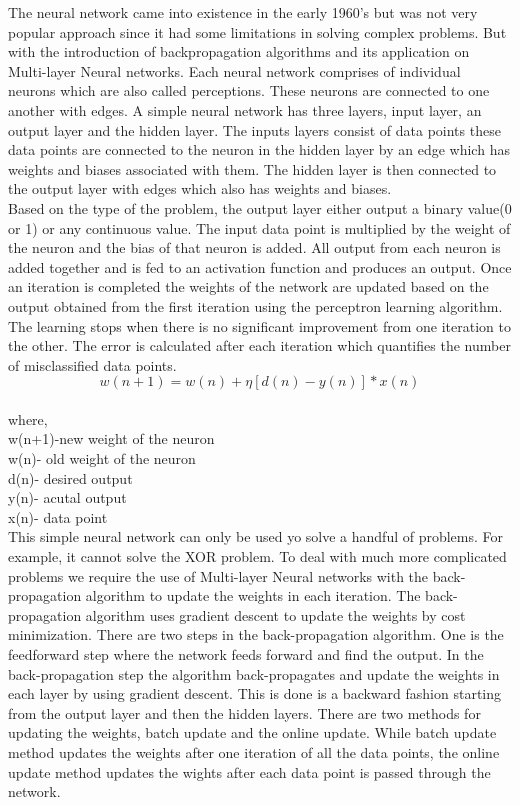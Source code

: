 \documentclass[sigconf]{acmart}
\begin{document}
The neural network came into existence in the early 1960's but was not very popular approach since it had some limitations in solving complex problems. But with the introduction of backpropagation algorithms and its application on Multi-layer Neural networks. Each neural network comprises of individual neurons which are also called perceptions. These neurons are connected to one another with edges. A simple neural network has three layers, input layer, an output layer and the hidden layer. The inputs layers consist of data points these data points are connected to the neuron in the hidden layer by an edge which has weights and biases associated with them. The hidden layer is then connected to the output layer with edges which also has weights and biases.\cite{Williamson1}\\
Based on the type of the problem, the output layer either output a binary value(0 or 1) or any continuous value. The input data point is multiplied by the weight of the neuron and the bias of that neuron is added. All output from each neuron is added together and is fed to an activation function and produces an output. Once an iteration is completed the weights of the network are updated based on the output obtained from the first iteration using the perceptron learning algorithm. The learning stops when there is no significant improvement from one iteration to the other. The error is calculated after each iteration which quantifies the number of misclassified data points.\cite{Williamson1}\\
\begin{equation}
   w(n+1) = w(n) + \eta[d(n)-y(n)]*x(n)
\end{equation}\\
where,\\
w(n+1)-new weight of the neuron\\
w(n)- old weight of the neuron\\
d(n)- desired output\\
y(n)- acutal output\\
x(n)- data point\\
This simple neural network can only be used yo solve a handful of problems. For example, it cannot solve the XOR problem. To deal with much more complicated problems we require the use of Multi-layer Neural networks with the back-propagation algorithm to update the weights in each iteration. The back-propagation algorithm uses gradient descent to update the weights by cost minimization. There are two steps in the back-propagation algorithm. One is the feedforward step where the network feeds forward and find the output. In the back-propagation step the algorithm back-propagates and update the weights in each layer by using gradient descent. This is done is a backward fashion starting from the output layer and then the hidden layers. There are two methods for updating the weights, batch update and the online update. While batch update method updates the weights after one iteration of all the data points, the online update method updates the wights after each data point is passed through the network.\cite{Williamson1}\\
\end{document}
